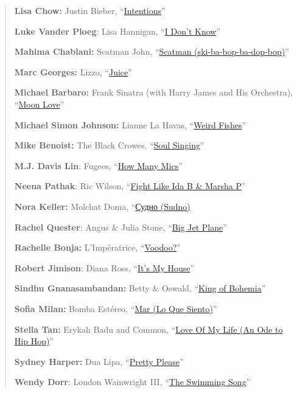 \begin{quote}
\textbf{Lisa Chow:} Justin Bieber,
``\href{https://www.youtube.com/watch?v=3AyMjyHu1bA}{Intentions}''

\textbf{Luke Vander Ploeg}: Lisa Hannigan,
``\href{https://www.youtube.com/watch?v=WSaPbVjcrp4}{I Don't Know}''

\textbf{Mahima Chablani:} Scatman John,
``\href{https://www.youtube.com/watch?v=Hy8kmNEo1i8}{Scatman
(ski-ba-bop-ba-dop-bop)}''

\textbf{Marc Georges:} Lizzo,
``\href{https://www.youtube.com/watch?v=XaCrQL_8eMY}{Juice}''

\textbf{Michael Barbaro:} Frank Sinatra (with Harry James and His
Orchestra), ``\href{https://www.youtube.com/watch?v=dr23NWHEsbU}{Moon
Love}''

\textbf{Michael Simon Johnson:} Lianne La Havas,
``\href{https://www.youtube.com/watch?v=AHeW8McMBS8}{Weird Fishes}''

\textbf{Mike Benoist:} The Black Crowes,
``\href{https://www.youtube.com/watch?v=YtX6ZgEG1Jg\&pbjreload=101}{Soul
Singing}''

\textbf{M.J. Davis Lin}: Fugees,
``\href{https://www.youtube.com/watch?v=B8LSTgs6Vy0}{How Many Mics}''

\textbf{Neena Pathak}: Ric Wilson,
``\href{https://www.youtube.com/watch?v=Dgxh9Rs6D8c}{Fight Like Ida B \&
Marsha P}''

\textbf{Nora Keller:} Molchat Doma,
``\href{https://www.youtube.com/watch?v=HR5zpFs7YpY}{Судно (Sudno)}

\textbf{Rachel Quester}: Angus \& Julia Stone,
``\href{https://www.youtube.com/watch?v=yFTvbcNhEgc}{Big Jet Plane}''

\textbf{Rachelle Bonja:} L'Impératrice,
``\href{https://www.youtube.com/watch?v=PAIllq_srAk}{Voodoo?}''

\textbf{Robert Jimison}: Diana Ross,
``\href{https://www.youtube.com/watch?v=QO93p3ZZ8Xw}{It's My House}''

\textbf{Sindhu Gnanasambandan:} Betty \& Oswald,
``\href{https://www.youtube.com/watch?v=J1JHVOfzVnc}{King of Bohemia}''

\textbf{Sofia Milan:} Bomba Estéreo,
``\href{https://www.youtube.com/watch?v=jgjRPk4E6Eg}{Mar (Lo Que
Siento)}''

\textbf{Stella Tan:} Erykah Badu and Common,
``\href{https://www.youtube.com/watch?v=l6mFqvcknNM}{Love Of My Life (An
Ode to Hip Hop)}''

\textbf{Sydney Harper:} Dua Lipa,
``\href{https://www.youtube.com/watch?v=ylzhMn6MlVc}{Pretty Please}''

\textbf{Wendy Dorr}: Loudon Wainwright III,
``\href{https://www.youtube.com/watch?v=fuz5TKzaJoE}{The Swimming
Song}''
\end{quote}

